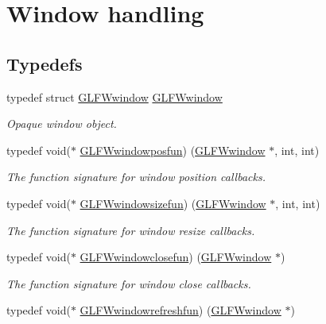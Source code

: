 \hypertarget{group__window}{}\section{Window handling}
\label{group__window}
\subsection*{Typedefs}
\begin{DoxyCompactItemize}
\item 
typedef struct \hyperlink{group__window_ga3c96d80d363e67d13a41b5d1821f3242}{G\+L\+F\+Wwindow} \hyperlink{group__window_ga3c96d80d363e67d13a41b5d1821f3242}{G\+L\+F\+Wwindow}
\begin{DoxyCompactList}\small\item\em Opaque window object. \end{DoxyCompactList}\item 
typedef void($\ast$ \hyperlink{group__window_gafd8db81fdb0e850549dc6bace5ed697a}{G\+L\+F\+Wwindowposfun}) (\hyperlink{group__window_ga3c96d80d363e67d13a41b5d1821f3242}{G\+L\+F\+Wwindow} $\ast$, int, int)
\begin{DoxyCompactList}\small\item\em The function signature for window position callbacks. \end{DoxyCompactList}\item 
typedef void($\ast$ \hyperlink{group__window_gae49ee6ebc03fa2da024b89943a331355}{G\+L\+F\+Wwindowsizefun}) (\hyperlink{group__window_ga3c96d80d363e67d13a41b5d1821f3242}{G\+L\+F\+Wwindow} $\ast$, int, int)
\begin{DoxyCompactList}\small\item\em The function signature for window resize callbacks. \end{DoxyCompactList}\item 
typedef void($\ast$ \hyperlink{group__window_ga93e7c2555bd837f4ed8b20f76cada72e}{G\+L\+F\+Wwindowclosefun}) (\hyperlink{group__window_ga3c96d80d363e67d13a41b5d1821f3242}{G\+L\+F\+Wwindow} $\ast$)
\begin{DoxyCompactList}\small\item\em The function signature for window close callbacks. \end{DoxyCompactList}\item 
typedef void($\ast$ \hyperlink{group__window_ga7a56f9e0227e2cd9470d80d919032e08}{G\+L\+F\+Wwindowrefreshfun}) (\hyperlink{group__window_ga3c96d80d363e67d13a41b5d1821f3242}{G\+L\+F\+Wwindow} $\ast$)

\end{DoxyCompactItemize}
